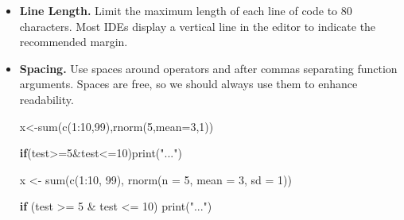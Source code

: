 \documentclass[
  11pt,
]{book}
\newenvironment{Shaded}{\begin{snugshade}}{\end{snugshade}}
\newcommand{\AttributeTok}[1]{\textcolor[rgb]{0.77,0.63,0.00}{#1}}
\newcommand{\ControlFlowTok}[1]{\textcolor[rgb]{0.13,0.29,0.53}{\textbf{#1}}}
\newcommand{\DecValTok}[1]{\textcolor[rgb]{0.00,0.00,0.81}{#1}}
\newcommand{\FunctionTok}[1]{\textcolor[rgb]{0.00,0.00,0.00}{#1}}
\newcommand{\NormalTok}[1]{#1}
\newcommand{\OtherTok}[1]{\textcolor[rgb]{0.56,0.35,0.01}{#1}}
\newcommand{\SpecialCharTok}[1]{\textcolor[rgb]{0.00,0.00,0.00}{#1}}
\newcommand{\StringTok}[1]{\textcolor[rgb]{0.31,0.60,0.02}{#1}}
\newenvironment{code-tex-bad}
  {\begingroup\definecolor{shadecolor}{RGB}{255, 189, 185}}
  {\endgroup}
\newenvironment{code-tex-good}
  {\begingroup\definecolor{shadecolor}{RGB}{224, 240, 227}}
  {\endgroup}
\begin{document}
\begin{itemize}
\item
  \textbf{Line Length.} Limit the maximum length of each line of code to 80 characters. Most IDEs display a vertical line in the editor to indicate the recommended margin.
\item
  \textbf{Spacing.} Use spaces around operators and after commas separating function arguments. Spaces are free, so we should always use them to enhance readability.

  \begin{code-tex-bad}

\begin{Shaded}
\begin{Highlighting}[]
\NormalTok{x}\OtherTok{\textless{}{-}}\FunctionTok{sum}\NormalTok{(}\FunctionTok{c}\NormalTok{(}\DecValTok{1}\SpecialCharTok{:}\DecValTok{10}\NormalTok{,}\DecValTok{99}\NormalTok{),}\FunctionTok{rnorm}\NormalTok{(}\DecValTok{5}\NormalTok{,}\AttributeTok{mean=}\DecValTok{3}\NormalTok{,}\DecValTok{1}\NormalTok{))}

\ControlFlowTok{if}\NormalTok{(test}\SpecialCharTok{\textgreater{}=}\DecValTok{5}\SpecialCharTok{\&}\NormalTok{test}\SpecialCharTok{\textless{}=}\DecValTok{10}\NormalTok{)}\FunctionTok{print}\NormalTok{(}\StringTok{"..."}\NormalTok{)}
\end{Highlighting}
\end{Shaded}

  \end{code-tex-bad}

  \begin{code-tex-good}

\begin{Shaded}
\begin{Highlighting}[]
\NormalTok{x }\OtherTok{\textless{}{-}} \FunctionTok{sum}\NormalTok{(}\FunctionTok{c}\NormalTok{(}\DecValTok{1}\SpecialCharTok{:}\DecValTok{10}\NormalTok{, }\DecValTok{99}\NormalTok{), }\FunctionTok{rnorm}\NormalTok{(}\AttributeTok{n =} \DecValTok{5}\NormalTok{, }\AttributeTok{mean =} \DecValTok{3}\NormalTok{, }\AttributeTok{sd =} \DecValTok{1}\NormalTok{))}

\ControlFlowTok{if}\NormalTok{ (test }\SpecialCharTok{\textgreater{}=} \DecValTok{5} \SpecialCharTok{\&}\NormalTok{ test }\SpecialCharTok{\textless{}=} \DecValTok{10}\NormalTok{) }\FunctionTok{print}\NormalTok{(}\StringTok{"..."}\NormalTok{)}
\end{Highlighting}
\end{Shaded}


\end{code-tex-good}
\end{itemize}
\end{document}
